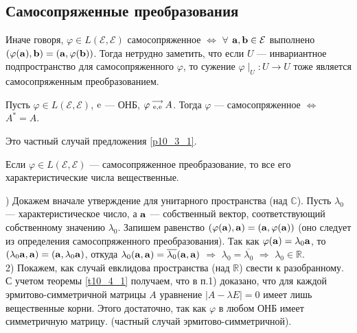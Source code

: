 \subsection{Самосопряженные преобразования}


Иначе говоря, $\varphi \in L(\mathcal{E}, \mathcal{E})$ самосопряженное 
$\Leftrightarrow$ $\forall$ $\mathbf{a}, \mathbf{b} \in \mathcal{E}$ выполнено $(\varphi(\mathbf{a}), \mathbf{b})= (\mathbf{a}, \varphi(\mathbf{b}))$.
Тогда нетрудно заметить, что если $U$ --- инвариантное подпространство для самосопряженного $\varphi$, 
то сужение $\varphi \mid_{U} : U \to U$ тоже является самосопряженным преобразованием.

\begin{theor}\label{t10_4_1} 
Пусть $\varphi \in L(\mathcal{E}, \mathcal{E})$, $\mathrm{e}$ --- ОНБ, $\varphi \begin{smallmatrix} \longrightarrow \\ \mathrm{e}, \mathrm{e} \end{smallmatrix} A$.
Тогда  $\varphi$ --- самосопряженное $\Leftrightarrow$ $A^{*}=A$.
\end{theor}
\dok Это частный случай предложения \ref{p10_3_1}.
\edok


\begin{theor}\label{t10_4_2} 
Если $\varphi\in L(\mathcal{E}, \mathcal{E})$ --- самосопряженное преобразование,
то все его характеристические числа вещественные. %
\end{theor}
) Докажем вначале утверждение для унитарного пространства (над $\mathbb{C}$). Пусть $\lambda_0$ --- характеристическое число, а $\mathbf{a}$ --- собственный вектор, 
соответствующий собственному значению $\lambda_0$.
Запишем равенство $(\varphi(\mathbf{a}), \mathbf{a}) = (\mathbf{a}, \varphi(\mathbf{a}))$ (оно следует из определения самосопряженного преобразования).
Так как $\varphi(\mathbf{a}) = \lambda_0 \mathbf{a}$, то $(\lambda_0 \mathbf{a}, \mathbf{a}) = (\mathbf{a}, \lambda_0 \mathbf{a})$, откуда 
$\lambda_0  (\mathbf{a}, \mathbf{a}) = \overline{\lambda_0} (\mathbf{a},  \mathbf{a})$ $\Rightarrow$ $\lambda_0 = \overline{\lambda_0}$ $\Rightarrow$ $\lambda_0 \in \mathbb{R}$.\\
2) Покажем, как случай евклидова пространства (над $\mathbb{R}$) свести к разобранному. С учетом теоремы \ref{t10_4_1} получаем, что в п.1) доказано, что 
для каждой эрмитово-симметричной матрицы $A$ уравнение $|A-\lambda E|=0$ имеет лишь вещественные корни. Этого достаточно, так как  $\varphi$ в любом ОНБ имеет симметричную матрицу.
(частный случай эрмитово-симметричной).
\edok


